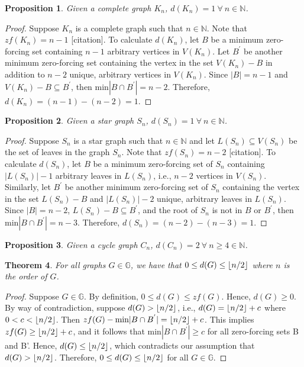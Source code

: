 \documentclass{article}
\DeclarePairedDelimiter\floor{\lfloor}{\rfloor}
\newtheorem{theorem}{Theorem}[section]
\newtheorem{proposition}[theorem]{Proposition}
\theoremstyle{definition}
\begin{document}
\begin{proposition}
Given a complete graph $K_n$, $d(K_n)=1 \ \forall \ n \in \mathbb{N}$.
\end{proposition}
\begin{proof}
Suppose $K_n$ is a complete graph such that $n \in \mathbb{N}$.
Note that $zf(K_n) = n - 1$ [citation].
To calculate $d(K_n)$, let $B$ be a minimum zero-forcing set containing $n-1$ arbitrary vertices in $V(K_n)$.
Let $B^{'}$ be another minimum zero-forcing set containing the vertex in the set $V(K_n) - B$ in addition  to $n-2$ unique, arbitrary vertices in $V(K_n)$.
Since $|B| = n- 1$ and $V(K_n) - B \subseteq B^{'}$, then $\text{min}|B \cap B^{'}| = n-2$.
Therefore, $d(K_n) = (n-1) - (n-2) = 1$.
\end{proof}

\begin{proposition}
Given a star graph $S_n$, $d(S_n)=1 \ \forall \ n \in \mathbb{N}$.
\end{proposition}
\begin{proof}
Suppose $S_n$ is a star graph such that $n \in \mathbb{N}$ and let $L(S_n) \subseteq V(S_n)$ be the set of leaves in the graph $S_n$.
Note that $zf(S_n) = n - 2$ [citation].
To calculate $d(S_n)$, let $B$ be a minimum zero-forcing set of $S_n$ containing $|L(S_n)| - 1$ arbitrary leaves in $L(S_n)$, i.e., $n - 2$ vertices in $V(S_n)$.
Similarly, let $B^{'}$ be another minimum zero-forcing set of $S_n$ containing the vertex in the set $L(S_n) - B$ and  $|L(S_n)|-2$ unique, arbitrary leaves in $L(S_n)$.
Since $|B| = n - 2$, $L(S_n) - B \subseteq B^{'}$, and the root of $S_n$ is not in $B$ or $B^{'}$, then $\text{min}|B \cap B^{'}| = n - 3$.
Therefore, $d(S_n) = (n - 2) - (n-3) = 1$.
\end{proof}

\begin{proposition}
Given a cycle graph $C_n$, $d(C_n)=2 \ \forall \ n \geq 4 \in \mathbb{N}$.
\end{proposition}

\begin{theorem}
For all graphs $G \in \mathbb{G}$, we have that $0 \leq d(G) \leq \floor{n/2}$ where $n$ is the order of $G$.
\end{theorem}
\begin{proof}
Suppose $G \in \mathbb{G}$.
By definition, $0 \leq d(G) \leq zf(G)$.
Hence, $d(G) \geq 0$.
By way of contradiction, suppose $d(G) > \floor{n/2}$, i.e., $d(G) = \floor{n/2} + c$ where $0 < c < \floor{n/2}$.
Then $zf(G) - \text{min}|B \cap B^{'}| = \floor{n/2} + c$.
This implies $zf(G) \geq \floor{n/2} + c$, and it follows that  $\text{min}|B\cap B^{'}| \geq c$ for all zero-forcing sets B and B'. 
Hence, $d(G) \leq \floor{n/2}$, which contradicts our assumption that $d(G) > \floor{n/2}$.
Therefore, $0 \leq d(G) \leq \floor{n/2}$  for all $G \in \mathbb{G}$.
\end{proof}
\end{document}
